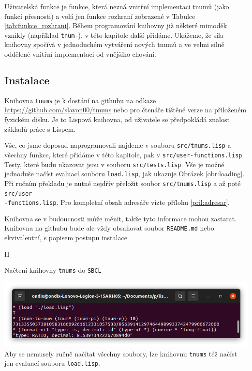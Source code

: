 Uživatelská funkce je funkce, která nezná vnitřní implementaci tnumů (jako funkcí přesnosti) a volá jen funkce rozhraní zobrazené v Tabulce \ref{tab:funkce_rozhrani}. Během programování knihovny již některé mimoděk vznikly (například \texttt{tnum-}), v této kapitole další přidáme. Ukážeme, že síla knihovny spočívá v jednoduchém vytváření nových tnumů a ve velmi silně oddělené vnitřní implementaci od vnějšího chování.

\subsection{Instalace}\label{ssec:inst}
Knihovna \texttt{tnums} je k dostání na githubu na odkaze \url{https://github.com/slavon00/tnums} nebo pro čtenáře tištěné verze na přiloženém fyzickém disku. Je to Lispová knihovna, od uživatele se předpokládá znalost základů práce s Lispem.

Vše, co jsme doposud naprogramovali najdeme v souboru \texttt{src/tnums.lisp} a všechny funkce, které přidáme v této kapitole, pak v \texttt{src/user-functions.lisp}. Testy, které budu ukazovat jsou v souboru \texttt{src/tests.lisp}. Vše je možné jednoduše načíst evaluací souboru \texttt{load.lisp}, jak ukazuje Obrázek \ref{obr:loading}. Při ručním překladu je nutné nejdřív přeložit soubor \texttt{src/tnums.lisp} a až poté \texttt{src/user-}\\\texttt{-functions.lisp}. Pro kompletní obsah adresáře vizte přílohu \ref{pril:adresar}.

Knihovna se v budoucnosti může měnit, takže tyto informace mohou zastarat. Knihovna na githubu bude ale vždy obsahovat soubor \texttt{README.md} nebo ekvivalentní, s popisem postupu instalace.

\begin{myfigure}{H}
\caption{Načtení knihovny \texttt{tnums} do \texttt{SBCL}}
\includegraphics[width=\linewidth]{./graphics/loading2.png}\label{obr:loading}
Aby se nemusely ručně načítat všechny soubory, lze knihovnu \texttt{tnums} též načíst jen evaluací souboru \texttt{load.lisp}. 
\end{myfigure}

